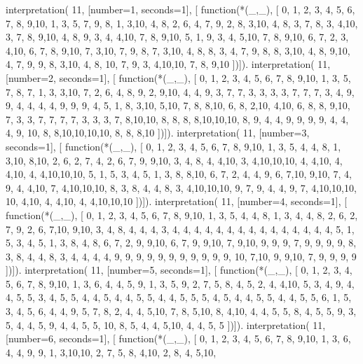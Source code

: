 interpretation( 11, [number=1, seconds=1], [
  function(*(_,_), [
     0, 1, 2, 3, 4, 5, 6, 7, 8, 9,10,
     1, 3, 5, 7, 9, 8, 1, 3,10, 4, 8,
     2, 6, 4, 7, 9, 2, 8, 3,10, 4, 8,
     3, 7, 8, 3, 4,10, 3, 7, 8, 9,10,
     4, 8, 9, 3, 4, 4,10, 7, 8, 9,10,
     5, 1, 9, 3, 4, 5,10, 7, 8, 9,10,
     6, 7, 2, 3, 4,10, 6, 7, 8, 9,10,
     7, 3,10, 7, 9, 8, 7, 3,10, 4, 8,
     8, 3, 4, 7, 9, 8, 8, 3,10, 4, 8,
     9,10, 4, 7, 9, 9, 8, 3,10, 4, 8,
    10, 7, 9, 3, 4,10,10, 7, 8, 9,10 ])]).
interpretation( 11, [number=2, seconds=1], [
  function(*(_,_), [
     0, 1, 2, 3, 4, 5, 6, 7, 8, 9,10,
     1, 3, 5, 7, 8, 7, 1, 3, 3,10, 7,
     2, 6, 4, 8, 9, 2, 9,10, 4, 4, 9,
     3, 7, 7, 3, 3, 3, 3, 7, 7, 7, 3,
     4, 9, 9, 4, 4, 4, 4, 9, 9, 9, 4,
     5, 1, 8, 3,10, 5,10, 7, 8, 8,10,
     6, 8, 2,10, 4,10, 6, 8, 8, 9,10,
     7, 3, 3, 7, 7, 7, 7, 3, 3, 3, 7,
     8,10,10, 8, 8, 8, 8,10,10,10, 8,
     9, 4, 4, 9, 9, 9, 9, 4, 4, 4, 9,
    10, 8, 8,10,10,10,10, 8, 8, 8,10 ])]).
interpretation( 11, [number=3, seconds=1], [
  function(*(_,_), [
     0, 1, 2, 3, 4, 5, 6, 7, 8, 9,10,
     1, 3, 5, 4, 4, 8, 1, 3,10, 8,10,
     2, 6, 2, 7, 4, 2, 6, 7, 9, 9,10,
     3, 4, 8, 4, 4,10, 3, 4,10,10,10,
     4, 4,10, 4, 4,10, 4, 4,10,10,10,
     5, 1, 5, 3, 4, 5, 1, 3, 8, 8,10,
     6, 7, 2, 4, 4, 9, 6, 7,10, 9,10,
     7, 4, 9, 4, 4,10, 7, 4,10,10,10,
     8, 3, 8, 4, 4, 8, 3, 4,10,10,10,
     9, 7, 9, 4, 4, 9, 7, 4,10,10,10,
    10, 4,10, 4, 4,10, 4, 4,10,10,10 ])]).
interpretation( 11, [number=4, seconds=1], [
  function(*(_,_), [
     0, 1, 2, 3, 4, 5, 6, 7, 8, 9,10,
     1, 3, 5, 4, 4, 8, 1, 3, 4, 4, 8,
     2, 6, 2, 7, 9, 2, 6, 7,10, 9,10,
     3, 4, 8, 4, 4, 4, 3, 4, 4, 4, 4,
     4, 4, 4, 4, 4, 4, 4, 4, 4, 4, 4,
     5, 1, 5, 3, 4, 5, 1, 3, 8, 4, 8,
     6, 7, 2, 9, 9,10, 6, 7, 9, 9,10,
     7, 9,10, 9, 9, 9, 7, 9, 9, 9, 9,
     8, 3, 8, 4, 4, 8, 3, 4, 4, 4, 4,
     9, 9, 9, 9, 9, 9, 9, 9, 9, 9, 9,
    10, 7,10, 9, 9,10, 7, 9, 9, 9, 9 ])]).
interpretation( 11, [number=5, seconds=1], [
  function(*(_,_), [
     0, 1, 2, 3, 4, 5, 6, 7, 8, 9,10,
     1, 3, 6, 4, 4, 5, 9, 1, 3, 5, 9,
     2, 7, 5, 8, 4, 5, 2, 4, 4,10, 5,
     3, 4, 9, 4, 4, 5, 5, 3, 4, 5, 5,
     4, 4, 5, 4, 4, 5, 5, 4, 4, 5, 5,
     5, 4, 5, 4, 4, 5, 5, 4, 4, 5, 5,
     6, 1, 5, 3, 4, 5, 6, 4, 4, 9, 5,
     7, 8, 2, 4, 4, 5,10, 7, 8, 5,10,
     8, 4,10, 4, 4, 5, 5, 8, 4, 5, 5,
     9, 3, 5, 4, 4, 5, 9, 4, 4, 5, 5,
    10, 8, 5, 4, 4, 5,10, 4, 4, 5, 5 ])]).
interpretation( 11, [number=6, seconds=1], [
  function(*(_,_), [
     0, 1, 2, 3, 4, 5, 6, 7, 8, 9,10,
     1, 3, 6, 4, 4, 9, 9, 1, 3,10,10,
     2, 7, 5, 8, 4,10, 2, 8, 4, 5,10,
